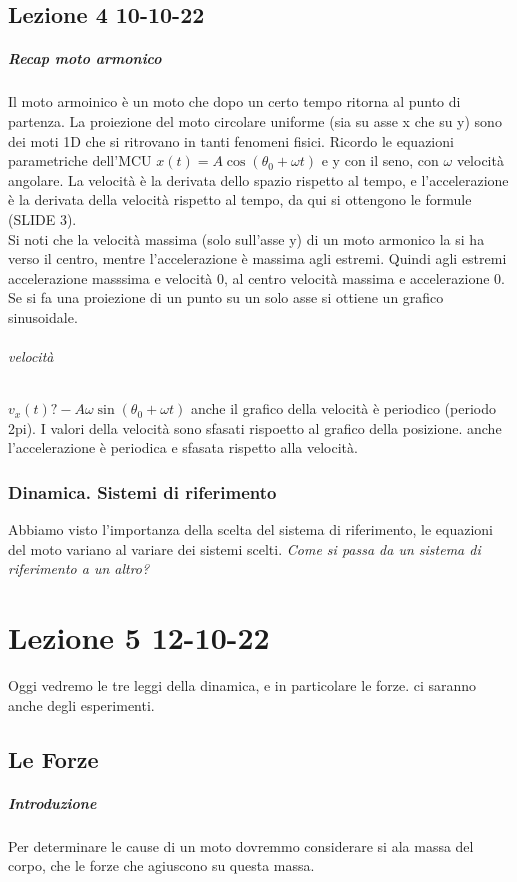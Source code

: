 \documentclass[12pt, a4paper, openany]{book}
\begin{document}
\section*{Lezione 4 10-10-22}
\paragraph*{Recap moto armonico} %
Il moto armoinico è un moto che dopo un certo tempo ritorna al punto di partenza.
La proiezione del moto circolare uniforme (sia su asse x che su y) sono dei moti 1D che si ritrovano in tanti fenomeni fisici.
Ricordo le equazioni parametriche dell'MCU $x(t) = A \cos(\theta_0 + \omega t)$ e y con il seno, con $\omega$ velocità angolare.
La velocità è la derivata dello spazio rispetto al tempo, e l'accelerazione è la derivata della velocità rispetto al tempo, da qui si ottengono le formule (SLIDE 3).
\\Si noti che la velocità massima (solo sull'asse y) di un moto armonico la si ha verso il centro, mentre l'accelerazione è massima agli estremi.
Quindi agli estremi accelerazione masssima e velocità 0, al centro velocità massima e accelerazione 0.
Se si fa una proiezione di un punto su un solo asse si ottiene un grafico sinusoidale.
\subparagraph{velocità}$v_x(t)?-A \omega \sin (\theta_0+\omega t)$ anche il grafico della velocità è periodico (periodo 2pi).
I valori della velocità sono sfasati rispoetto al grafico della posizione.
anche l'accelerazione è periodica e sfasata rispetto alla velocità.
\subsection*{Dinamica. Sistemi di riferimento}%
Abbiamo visto l'importanza della scelta del sistema di riferimento, le equazioni del moto variano al variare dei sistemi scelti.
\emph{Come si passa da un sistema di riferimento a un altro?}


\chapter{Lezione 5 12-10-22}
Oggi vedremo le tre leggi della dinamica, e in particolare le forze. ci saranno anche degli esperimenti.
\section{Le Forze}
\paragraph*{Introduzione}
Per determinare le cause di un moto dovremmo considerare si ala massa del corpo, che le forze che agiuscono su questa massa.
\end{document}
